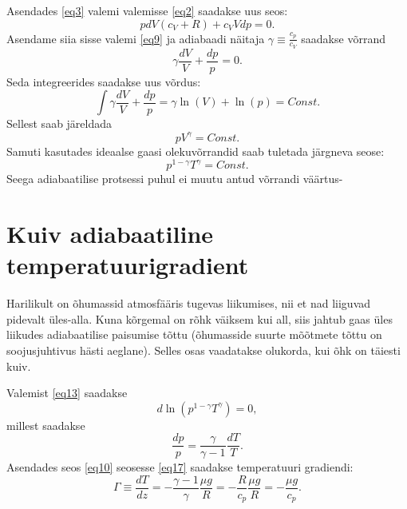 \documentclass{trkut}%
\begin{document}
Asendades \ref{eq3} valemi valemisse \ref{eq2} saadakse uus seos:
\begin{equation}\label{eq4}
pdV(c_V+R)+c_VVdp=0.
\end{equation}
Asendame siia sisse valemi \ref{eq9} ja adiabaadi näitaja $ \gamma \equiv \frac{c_p}{c_V}$ saadakse võrrand
\begin{equation*}
\gamma \frac{dV}{V} + \frac{dp}{p} = 0.
\end{equation*}
Seda integreerides saadakse uus võrdus:
\begin{equation*}
 \int \gamma \frac{dV}{V} + \frac{dp}{p} = \gamma \ln(V) + \ln(p) = Const.
\end{equation*}
Sellest saab järeldada
\begin{equation*}
pV^\gamma = Const.
\end{equation*}
Samuti kasutades ideaalse gaasi olekuvõrrandid saab tuletada järgneva seose:
\begin{equation}\label{eq13}
p^{1-\gamma}T^\gamma = Const.
\end{equation}
Seega adiabaatilise protsessi puhul ei muutu antud võrrandi väärtus-

\section{Kuiv adiabaatiline temperatuurigradient }
Harilikult on õhumassid atmosfääris tugevas liikumises, nii et nad liiguvad pidevalt üles-alla. Kuna kõrgemal on rõhk väiksem kui all, siis jahtub gaas üles liikudes adiabaatilise paisumise tõttu (õhumasside suurte mõõtmete tõttu on soojusjuhtivus hästi aeglane). Selles osas vaadatakse olukorda, kui õhk on täiesti kuiv.

Valemist \ref{eq13} saadakse
\begin{equation*}
d\ln(p^{1-\gamma}T^\gamma) = 0,
\end{equation*}
millest saadakse
\begin{equation}\label{eq17}
\frac{dp}{p} = \frac{\gamma}{\gamma-1}\frac{dT}{T}.
\end{equation}
Asendades seos \ref{eq10} seosesse \ref{eq17} saadakse temperatuuri gradiendi:
\begin{equation}\label{eq11}
\Gamma \equiv \frac{dT}{dz}=-\frac{\gamma-1}{\gamma} \frac{\mu g}{R} = -\frac{R}{c_p}\frac{\mu g}{R} = -\frac{\mu g}{c_p}.
\end{equation}
\end{document}

